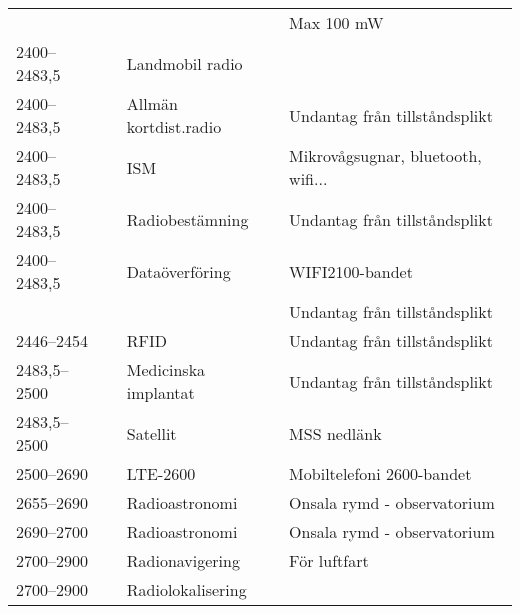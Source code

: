 \begin{landscape}
\begin{longtable}{llll}
	                   &                    &                         & Max 100 mW                               \\
	2400--2483,5       &                    & Landmobil radio         &  \\
	2400--2483,5       &                    & Allmän kortdist.radio   & Undantag från tillståndsplikt            \\
	2400--2483,5       &                    & ISM                     & Mikrovågsugnar, bluetooth, wifi...        \\
	2400--2483,5       &                    & Radiobestämning         & Undantag från tillståndsplikt            \\
	2400--2483,5       &                    & Dataöverföring          & WIFI2100-bandet                          \\
	                   &                    &                         & Undantag från tillståndsplikt            \\
	2446--2454         &                    & RFID                    & Undantag från tillståndsplikt            \\
	2483,5--2500       &                    & Medicinska implantat    & Undantag från tillståndsplikt            \\
	2483,5--2500       &                    & Satellit                & MSS nedlänk                              \\
	2500--2690         &                    & LTE-2600                & Mobiltelefoni 2600-bandet                \\
	2655--2690         &                    & Radioastronomi          & Onsala rymd - observatorium              \\
	2690--2700         &                    & Radioastronomi          & Onsala rymd - observatorium              \\
	2700--2900         &                    & Radionavigering         & För luftfart                             \\
	2700--2900         &                    & Radiolokalisering       &
\end{longtable}
\end{landscape}




